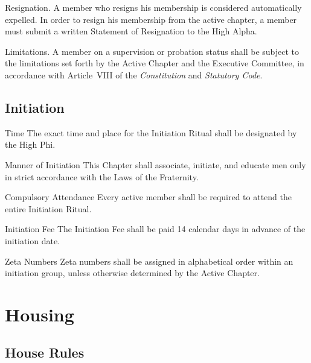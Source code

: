 \documentclass{article}
\begin{document}
\begin{subsubsectionList}
\begin{orderedList}
    \item {\titleStyle Resignation}. A member who resigns his membership is
    considered automatically expelled. In order to resign his membership from
    the active chapter, a member must submit a written Statement of Resignation
    to the High Alpha.

    \item {\titleStyle Limitations}. A member on a supervision or probation
    status shall be subject to the limitations set forth by the Active Chapter
    and the Executive Committee, in accordance with Article~VIII of the
    \emph{Constitution} and \emph{Statutory Code}.
  \end{orderedList}
\end{subsubsectionList}

\subsection{Initiation}

\begin{subsubsectionList}
  \item {\titleStyle Time\titleSuffix}
  The exact time and place for the Initiation Ritual shall be designated by the
  High Phi.

  \item {\titleStyle Manner of Initiation\titleSuffix}
  This Chapter shall associate, initiate, and educate men only in strict
  accordance with the Laws of the Fraternity.

  \item {\titleStyle Compulsory Attendance\titleSuffix}
  Every active member shall be required to attend the entire Initiation Ritual.

  \item {\titleStyle Initiation Fee\titleSuffix}
  The Initiation Fee shall be paid 14 calendar days in advance of the initiation
  date.

  \item {\titleStyle Zeta Numbers\titleSuffix}
  Zeta numbers shall be assigned in alphabetical order within an initiation
  group, unless otherwise determined by the Active Chapter.
\end{subsubsectionList}

\section{Housing}

\subsection{House Rules}
\end{document}
